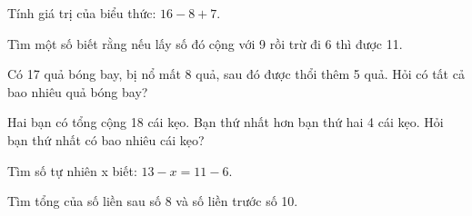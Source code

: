 \begin{ex} %
Tính giá trị của biểu thức: $16 - 8 + 7$.
\end{ex}

\begin{ex} %
Tìm một số biết rằng nếu lấy số đó cộng với 9 rồi trừ đi 6 thì được 11.
\end{ex}

\begin{ex} %
Có 17 quả bóng bay, bị nổ mất 8 quả, sau đó được thổi thêm 5 quả. Hỏi có tất cả bao nhiêu quả bóng bay?
\end{ex}

\begin{ex} %
Hai bạn có tổng cộng 18 cái kẹo. Bạn thứ nhất hơn bạn thứ hai 4 cái kẹo. Hỏi bạn thứ nhất có bao nhiêu cái kẹo?
\end{ex}

\begin{ex} %
Tìm số tự nhiên x biết: $13 - x = 11 - 6$.
\end{ex}

\begin{ex} %
Tìm tổng của số liền sau số 8 và số liền trước số 10.
\end{ex}
